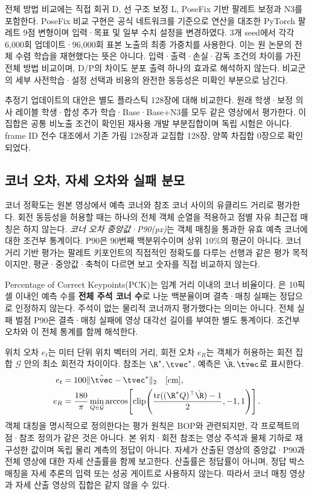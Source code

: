 전체 방법 비교에는 직접 회귀 D, 선 구조 보정 L, PoseFix 기반 팔레트 보정과 N3를 포함한다. PoseFix 비교 구현은 공식 네트워크를 기준으로 연산을 대조한 PyTorch 팔레트 9점 변형이며 입력·목표 및 일부 수치 설정을 변경하였다. 3개 seed에서 각각 6,000회 업데이트·96,000회 표본 노출의 최종 가중치를 사용한다. 이는 원 논문의 전체 수렴 학습을 재현했다는 뜻은 아니다. 입력·출력·손실·감독 조건의 차이를 가진 전체 방법 비교이며, D/P의 차이도 분포 출력 하나의 효과로 해석하지 않는다. 비교군의 세부 사전학습·설정 선택과 비용의 완전한 동등성은 미확인 부분으로 남긴다.

추정기 업데이트의 대안은 별도 플라스틱 128장에 대해 비교한다. 원래 학생·보정 의사 레이블 학생·합성 추가 학습·Base·Base+N3를 모두 같은 영상에서 평가한다. 이 집합은 공통 비노출 조건이 확인된 재사용 개발 부분집합이며 독립 시험은 아니다. frame ID 전수 대조에서 기존 가림 128장과 교집합 128장, 양쪽 차집합 0장으로 확인되었다.

\subsection{코너 오차, 자세 오차와 실패 분모}
코너 정확도는 원본 영상에서 예측 코너와 참조 코너 사이의 유클리드 거리로 평가한다. 회전 동등성을 허용할 때는 하나의 전체 객체 순열을 적용하고 점별 자유 최근접 매칭은 하지 않는다. \emph{코너 오차 중앙값·P90(px)}는 객체 매칭을 통과한 유효 예측 코너에 대한 조건부 통계이다. P90은 90번째 백분위수이며 상위 10\%의 평균이 아니다. 코너 거리 기반 평가는 팔레트 키포인트의 직접적인 정확도를 다루는 선행\cite{mueller2024}과 같은 평가 목적이지만, 평균·중앙값·축척이 다르면 보고 숫자를 직접 비교하지 않는다.

Percentage of Correct Keypoints(PCK)는 임계 거리 이내의 코너 비율이다. \pckten 은 10픽셀 이내인 예측 수를 \textbf{전체 주석 코너 수}로 나눈 백분율이며 결측·매칭 실패는 정답으로 인정하지 않는다. 주석이 없는 물리적 코너까지 평가했다는 의미는 아니다. 전체 실패 벌점 P90은 결측·매칭 실패에 영상 대각선 길이를 부여한 별도 통계이다. 조건부 오차와 이 전체 통계를 함께 해석한다.

위치 오차 $e_t$는 미터 단위 위치 벡터의 거리, 회전 오차 $e_R$는 객체가 허용하는 회전 집합 $\mathcal G$ 안의 최소 회전각 차이이다. 참조는 $\R^*,\tvec^*$, 예측은 $\hat\R,\hat\tvec$로 표시한다.
\begin{align}
 e_t&=100\|\hat\tvec-\tvec^*\|_2\quad[\mathrm{cm}],\\
 e_R&=\frac{180}{\pi}\min_{Q\in\mathcal G}\arccos\!\left[\operatorname{clip}\!\left(\frac{\operatorname{tr}((\R^*Q)^\top\hat\R)-1}{2},-1,1\right)\right].
\end{align}
객체 대칭을 명시적으로 정의한다는 평가 원칙은 BOP\cite{bop2018}와 관련되지만, 각 프로젝트의 점·참조 정의가 같은 것은 아니다. 본 위치·회전 참조는 영상 주석과 물체 기하로 재구성한 값이며 독립 물리 계측의 정답이 아니다. 자세가 산출된 영상의 중앙값·P90과 전체 영상에 대한 자세 산출률을 함께 보고한다. 산출률은 정답률이 아니며, 정답 박스 매칭을 자세 추론의 입력 또는 성공 게이트로 사용하지 않는다. 따라서 코너 매칭 영상과 자세 산출 영상의 집합은 같지 않을 수 있다.

